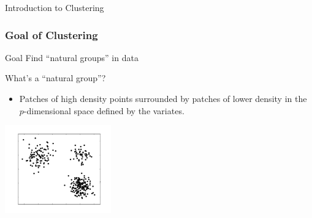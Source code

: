 \documentclass{beamer}
\begin{document}
\begin{frame}[plain,c]
\begin{center}
\Huge Introduction to Clustering
\end{center}
\end{frame}

\begin{frame}
  \frametitle{Goal of Clustering}

\begin{block}{Goal}
Find ``natural groups'' in data
\end{block}

What's a ``natural group''?

\begin{itemize}
  \item Patches of high density points surrounded by patches of lower density in the $p$-dimensional space defined by the variates.
\end{itemize}

\begin{center}
\includegraphics[height=1.5in]{cluster-fig.pdf}
\end{center}

\end{frame}



{ 

}
\end{document}
